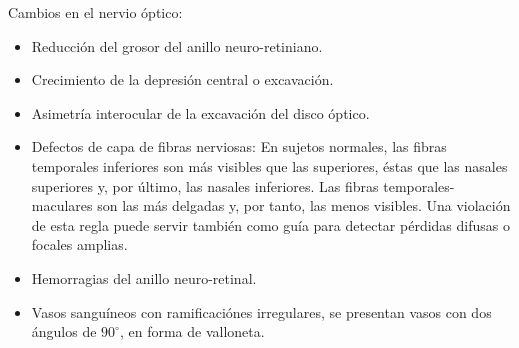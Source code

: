 \begin{description}
Cambios en el nervio \'optico:
\begin{itemize}
	\item Reducci\'on del grosor del anillo neuro-retiniano.
	\item Crecimiento de la depresi\'on central o excavaci\'on.
	\item Asimetr\'ia interocular de la excavaci\'on del disco \'optico.
	\item Defectos de capa de fibras nerviosas: En sujetos normales, las fibras temporales inferiores son m\'as visibles que las superiores, \'estas que las nasales superiores y, por \'ultimo, las nasales inferiores. Las fibras temporales-maculares son las m\'as delgadas y, por tanto, las menos visibles. Una violaci\'on de esta regla puede servir tambi\'en como gu\'ia para detectar p\'erdidas difusas o focales amplias.
	\item Hemorragias del anillo neuro-retinal.
	\item Vasos sangu\'ineos con ramificaci\'ones irregulares, se presentan vasos con dos ángulos de $90^{\circ}$, en forma de valloneta.
\end{itemize}
\end{description}


